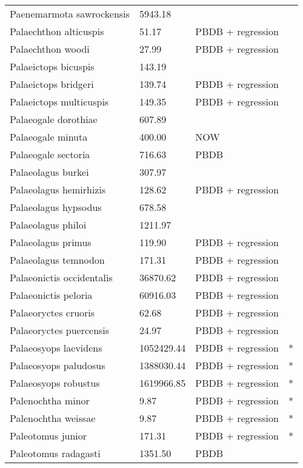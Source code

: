 \documentclass{article}
\begin{document}
\begin{center}
\begin{longtable}{p{} p{} p{} p{}}
    Paenemarmota sawrockensis & 5943.18 & \cite{Tomiya2013} &  \\ 
    Palaechthon alticuspis & 51.17 & PBDB + regression &  \\ 
    Palaechthon woodi & 27.99 & PBDB + regression &  \\ 
    Palaeictops bicuspis & 143.19 & \cite{Simons1960} &  \\ 
    Palaeictops bridgeri & 139.74 & PBDB + regression &  \\ 
    Palaeictops multicuspis & 149.35 & PBDB + regression &  \\ 
    Palaeogale dorothiae & 607.89 & \cite{Tomiya2013} &  \\ 
    Palaeogale minuta & 400.00 & NOW &  \\ 
    Palaeogale sectoria & 716.63 & PBDB &  \\ 
    Palaeolagus burkei & 307.97 & \cite{Tomiya2013} &  \\ 
    Palaeolagus hemirhizis & 128.62 & PBDB + regression &  \\ 
    Palaeolagus hypsodus & 678.58 & \cite{Tomiya2013} &  \\ 
    Palaeolagus philoi & 1211.97 & \cite{Tomiya2013} &  \\ 
    Palaeolagus primus & 119.90 & PBDB + regression &  \\ 
    Palaeolagus temnodon & 171.31 & PBDB + regression &  \\ 
    Palaeonictis occidentalis & 36870.62 & PBDB + regression &  \\ 
    Palaeonictis peloria & 60916.03 & PBDB + regression &  \\ 
    Palaeoryctes cruoris & 62.68 & PBDB + regression &  \\ 
    Palaeoryctes puercensis & 24.97 & PBDB + regression &  \\ 
    Palaeosyops laevidens & 1052429.44 & PBDB + regression & * \\ 
    Palaeosyops paludosus & 1388030.44 & PBDB + regression & * \\ 
    Palaeosyops robustus & 1619966.85 & PBDB + regression & * \\ 
    Palenochtha minor & 9.87 & PBDB + regression & * \\ 
    Palenochtha weissae & 9.87 & PBDB + regression & * \\ 
    Paleotomus junior & 171.31 & PBDB + regression & * \\ 
    Paleotomus radagasti & 1351.50 & PBDB &  \\ 

\end{longtable}
\end{center}
\end{document}
